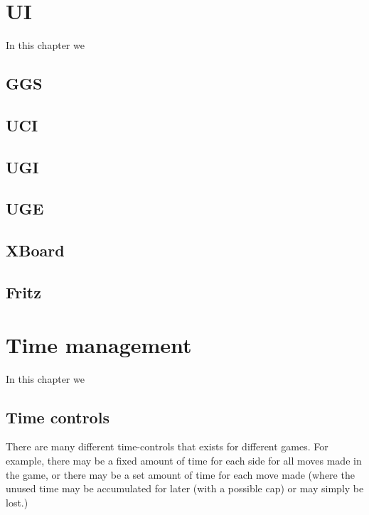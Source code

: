 \documentclass[10pt,dvipdfmx]{report}
\begin{document}
\chapter{UI}
\label{chap-ui}

In this chapter we 

\section{GGS}
\section{UCI}
\section{UGI}
\section{UGE}
\section{XBoard}
\section{Fritz}

\chapter{Time management}
\label{chap-time}

In this chapter we 

\section{Time controls}
There are many different time-controls that exists for different games.
For example, there may be a fixed amount of time for each side for all moves
made in the game, or there may be a set amount of time for each move made (where
the unused time may be accumulated for later (with a possible cap) or may simply
be lost.)
\end{document}
